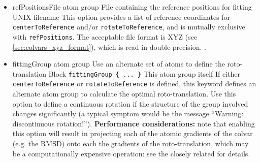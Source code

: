 \begin{itemize}
\item %
  \key%
    {refPositionsFile}{%
    atom group}{%
    File containing the reference positions for fitting}{%
    UNIX filename}{%
    \label{key:colvars:atom_group:refPositionsFile}
    This option provides a list of reference coordinates for \texttt{centerToReference} and/or \texttt{rotateToReference}, and is mutually exclusive with \texttt{refPositions}.
    The acceptable file format is XYZ (see \ref{sec:colvars_xyz_format}), which is read in double precision.
    .
}



\item %
  \keydef%
    {fittingGroup}{%
    atom group}{%
    Use an alternate set of atoms to define the roto-translation}{%
    Block \texttt{fittingGroup \{ ... \}}}{%
    This atom group itself}{%
    If either \texttt{centerToReference} or \texttt{rotateToReference} is defined, this keyword defines an alternate atom group to calculate the optimal roto-translation.
    Use this option to define a continuous rotation if the structure of the group involved changes significantly (a typical symptom would be the message ``Warning: discontinuous rotation!'').
    \textbf{Performance considerations:} note that enabling this option will result in projecting each of the atomic gradients of the colvar (e.g.{} the RMSD) onto each the gradients of the roto-translation, which may be a computationally expensive operation: see the closely related  for details.%
}

\end{itemize}

